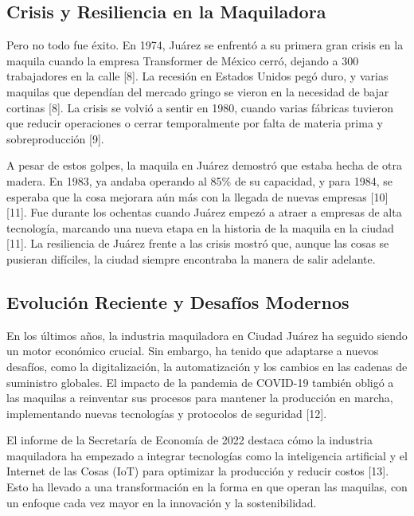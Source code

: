 \documentclass[
  10pt,
  letterpaper,
]{book}
\begin{document}
\subsection{Crisis y Resiliencia en la
Maquiladora}\label{crisis-y-resiliencia-en-la-maquiladora}

Pero no todo fue éxito. En 1974, Juárez se enfrentó a su primera gran
crisis en la maquila cuando la empresa Transformer de México cerró,
dejando a 300 trabajadores en la calle {[}8{]}. La recesión en Estados
Unidos pegó duro, y varias maquilas que dependían del mercado gringo se
vieron en la necesidad de bajar cortinas {[}8{]}. La crisis se volvió a
sentir en 1980, cuando varias fábricas tuvieron que reducir operaciones
o cerrar temporalmente por falta de materia prima y sobreproducción
{[}9{]}.

A pesar de estos golpes, la maquila en Juárez demostró que estaba hecha
de otra madera. En 1983, ya andaba operando al 85\% de su capacidad, y
para 1984, se esperaba que la cosa mejorara aún más con la llegada de
nuevas empresas {[}10{]}{[}11{]}. Fue durante los ochentas cuando Juárez
empezó a atraer a empresas de alta tecnología, marcando una nueva etapa
en la historia de la maquila en la ciudad {[}11{]}. La resiliencia de
Juárez frente a las crisis mostró que, aunque las cosas se pusieran
difíciles, la ciudad siempre encontraba la manera de salir adelante.

\subsection{Evolución Reciente y Desafíos
Modernos}\label{evoluciuxf3n-reciente-y-desafuxedos-modernos}

En los últimos años, la industria maquiladora en Ciudad Juárez ha
seguido siendo un motor económico crucial. Sin embargo, ha tenido que
adaptarse a nuevos desafíos, como la digitalización, la automatización y
los cambios en las cadenas de suministro globales. El impacto de la
pandemia de COVID-19 también obligó a las maquilas a reinventar sus
procesos para mantener la producción en marcha, implementando nuevas
tecnologías y protocolos de seguridad {[}12{]}.

El informe de la Secretaría de Economía de 2022 destaca cómo la
industria maquiladora ha empezado a integrar tecnologías como la
inteligencia artificial y el Internet de las Cosas (IoT) para optimizar
la producción y reducir costos {[}13{]}. Esto ha llevado a una
transformación en la forma en que operan las maquilas, con un enfoque
cada vez mayor en la innovación y la sostenibilidad.
\end{document}
